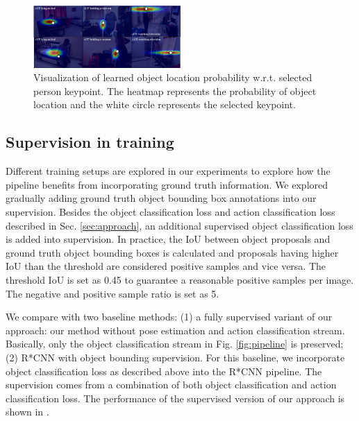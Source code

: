 \begin{figure}
\includegraphics[width=0.5\textwidth]{figures/distribution.pdf}
\caption{Visualization of learned object location probability w.r.t. selected person keypoint. The heatmap represents the probability of object location and the white circle represents the selected keypoint.}
\label{fig:distribution}
\end{figure} 

\subsection{Supervision in training}
\label{sec:supervision}
Different training setups are explored in our experiments to explore how the pipeline benefits from incorporating ground truth information. We explored gradually adding ground truth object bounding box annotations into our supervision. Besides the object classification loss and action classification loss described in Sec. \ref{sec:approach}, an additional supervised object classification loss is added into supervision. In practice, the IoU between object proposals and ground truth object bounding boxes is calculated and proposals having higher IoU than the threshold are considered positive samples and vice versa. The threshold IoU is set as 0.45 to guarantee a reasonable positive samples per image. The negative and positive sample ratio is set as 5. 

We compare with two baseline methods: (1) a fully supervised variant of our approach: our method without pose estimation and action classification stream. Basically, only the object classification stream in Fig. \ref{fig:pipeline} is preserved; (2) R*CNN \cite{gkioxari2015contextual} with object bounding supervision. For this baseline, we incorporate object classification loss as described above into the R*CNN pipeline. The supervision comes from a combination of both object classification and action classification loss. The performance of the supervised version of our approach is shown in .

